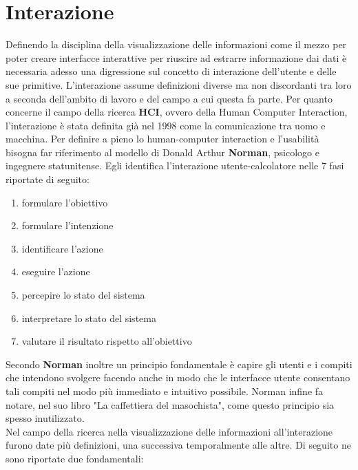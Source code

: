{\section{Interazione}
Definendo la disciplina della visualizzazione delle informazioni come il mezzo per poter creare interfacce interattive per riuscire ad estrarre informazione dai dati  è necessaria adesso una digressione sul concetto di interazione dell'utente e delle sue primitive.
L'interazione assume definizioni diverse ma non discordanti tra loro a seconda dell'ambito di lavoro e del campo a cui questa fa parte. 
Per quanto concerne il campo della ricerca \textbf{HCI}, ovvero della Human Computer Interaction, l'interazione è stata definita già nel 1998 come la comunicazione tra uomo e macchina.
Per definire a pieno lo human-computer interaction e l'usabilità bisogna far riferimento al modello di Donald Arthur\textbf{ Norman}, psicologo e ingegnere statunitense. Egli identifica l'interazione utente-calcolatore nelle 7 fasi riportate di seguito: 
\begin{enumerate}
	\item formulare l'obiettivo
	\item formulare l'intenzione
	\item identificare l'azione
	\item eseguire l'azione
	\item percepire lo stato del sistema
	\item interpretare lo stato del sistema
	\item valutare il risultato rispetto all'obiettivo
\end{enumerate}
Secondo \textbf{Norman} inoltre un principio fondamentale è capire gli utenti e i compiti che intendono svolgere facendo anche in modo che le interfacce utente consentano tali compiti nel modo più immediato e intuitivo possibile. Norman infine fa notare, nel suo libro "La caffettiera del masochista", come questo principio sia spesso inutilizzato.\\
Nel campo della ricerca nella visualizzazione delle informazioni all'interazione furono date più definizioni, una successiva temporalmente alle altre. Di seguito ne sono riportate due fondamentali:
\begin{itemize}

\end{itemize}}
